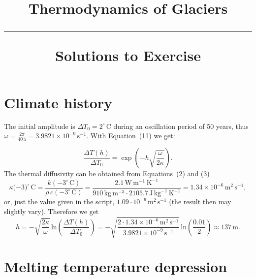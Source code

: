 \documentclass[10pt,DIV12,a4paper,halfparskip]{scrartcl}
\newcommand{\unit}[1]{\ensuremath{\,\mathrm{#1}}}
\newcommand{\cels}[1]{\ensuremath{#1^{\circ}\,\mathrm{C}}}
\begin{document}
\title{Thermodynamics of Glaciers \\
\rule[1em]{\textwidth}{2pt}
\LARGE{\sf Solutions to Exercise}
}
\date{}

\maketitle


\vspace{-5em}


\section{Climate history}

The initial amplitude is $\Delta T_0 = \cels{2}$ during an oscillation period of 50 years, thus $\omega = \frac{2\pi}{40\,\text{a}} = 3.9821\times 10^{-9}\,\text{s}^{-1}$. With Equation~(11) we get:

 \begin{equation*}
   \label{eq:temp-depth-amplitude}
   \frac{\Delta T(h)}{\Delta T_0}= \exp\left(-h \sqrt{\frac{\omega}{2\kappa}}\right).
 \end{equation*} The thermal diffusivity can be obtained from Equations~(2) and (3)
\begin{equation*}
\kappa(-\cels{3)} = \frac{k(-\cels{3})}{\rho\,c(-\cels{3})} = \frac{2.1\,\text{W}\,\text{m}^{-1}\,\text{K}^{-1}}{910\,\text{kg}\,\text{m}^{-3} \cdot 2105.7\,\text{J}\,\text{kg}^{-1}\,\text{K}^{-1}} = 1.34\times 10^{-6}\,\text{m}^{2}\,\text{s}^{-1}, 
\end{equation*} or, just the value given in the script, $1.09\cdot 10^{-6}\unit{m}^{2}\unit{s}^{-1}$ (the result then may slightly vary).
Therefore we get
\begin{equation*}
  h = -\sqrt{\frac{2\kappa}{\omega}}\,\text{ln}\left(\frac{\Delta T(h)}{\Delta T_0}\right)
  = - \sqrt{\frac{2\cdot 1.34\times 10^{-6}\,\text{m}^{2}\,\text{s}^{-1}}{3.9821\times 10^{-9}\,\text{s}^{-1}}}\,\text{ln}\left( \frac{0.01}{2}\right) \approx 137\,\text{m}.
\end{equation*}


\section{Melting temperature depression}
\end{document}
